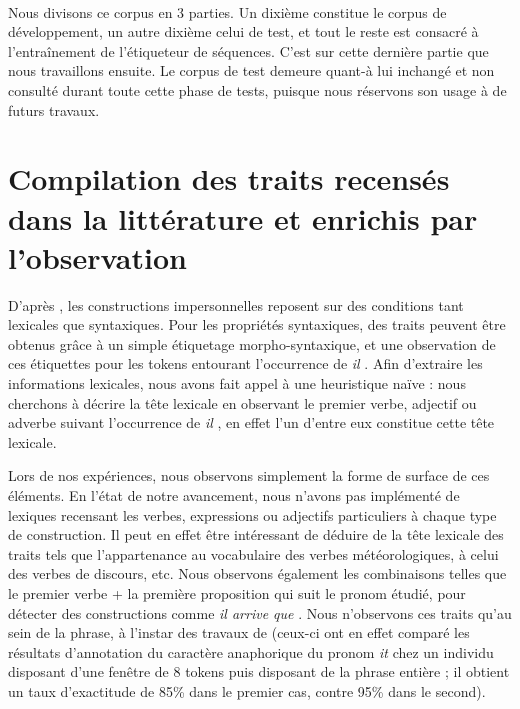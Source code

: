 \documentclass[a4paper,12pt]{article}
\begin{document}
\paragraph{}
Nous divisons ce corpus en 3 parties. Un dixième constitue le corpus de développement, un autre dixième celui de test, et tout le reste est consacré à l'entraînement de l'étiqueteur de séquences.
C'est sur cette dernière partie que nous travaillons ensuite.
Le corpus de test demeure quant-à lui inchangé et non consulté durant toute cette phase de tests, puisque nous réservons son usage à de futurs travaux.

\section{Compilation des traits recensés dans la littérature et enrichis par l'observation}
\label{approche-traits}

D'après \citeauthor{danlos-ilimp-taln2005}, les constructions impersonnelles reposent sur des conditions tant lexicales que syntaxiques. Pour les propriétés syntaxiques, des traits peuvent \^etre obtenus grâce à un simple étiquetage morpho-syntaxique, et une observation de ces étiquettes pour les tokens entourant l'occurrence de \og \textit{il} \fg{}. Afin d'extraire les informations lexicales, nous avons fait appel à une heuristique naïve : nous cherchons à décrire la tête lexicale en observant le premier verbe, adjectif ou adverbe suivant l'occurrence de \og \textit{il} \fg{}, en effet l'un d'entre eux constitue cette tête lexicale.

Lors de nos expériences, nous observons simplement la forme de surface de ces éléments. En l'état de notre avancement, nous n'avons pas implémenté de lexiques recensant les verbes, expressions ou adjectifs particuliers à chaque type de construction. Il peut en effet être intéressant de déduire de la tête lexicale des traits tels que l'appartenance au vocabulaire des verbes météorologiques, à celui des verbes de discours, etc.
Nous observons également les combinaisons telles que le premier verbe + la première proposition qui suit le pronom étudié, pour détecter des constructions comme \og \textit{il arrive que} \fg{}. Nous n'observons ces traits qu'au sein de la phrase, à l'instar des travaux de \citeauthor{Bergsma-11} (ceux-ci ont en effet comparé les résultats d'annotation du caractère anaphorique du pronom \og{}\textit{it}\fg{} chez un individu disposant d'une fenêtre de 8 tokens puis disposant de la phrase entière ; il obtient un taux d'exactitude de 85\% dans le premier cas, contre 95\% dans le second).
\end{document}
